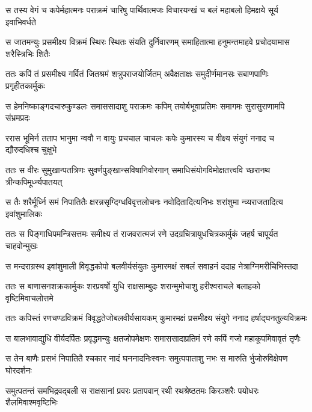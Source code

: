 \fourlineindentedshloka
{स तस्य वेगं च कपेर्महात्मनः}
{ पराक्रमं चारिषु पार्थिवात्मजः}
{विचारयन्खं च बलं महाबलो}
{ हिमक्षये सूर्य इवाभिवर्धते} %

\fourlineindentedshloka
{स जातमन्युः प्रसमीक्ष्य विक्रमं}
{ स्थिरः स्थितः संयति दुर्निवारणम्}
{समाहितात्मा हनुमन्तमाहवे}
{ प्रचोदयामास शरैस्त्रिभिः शितैः} %

\fourlineindentedshloka
{ततः कपिं तं प्रसमीक्ष्य गर्वितं}
{ जितश्रमं शत्रुपराजयोर्जितम्}
{अवैक्षताक्षः समुदीर्णमानसः}
{ सबाणपाणिः प्रगृहीतकार्मुकः} %

\fourlineindentedshloka
{स हेमनिष्काङ्गदचारुकुण्डलः}
{ समाससादाशु पराक्रमः कपिम्}
{तयोर्बभूवाप्रतिमः समागमः}
{ सुरासुराणामपि संभ्रमप्रदः} %

\fourlineindentedshloka
{ररास भूमिर्न तताप भानुमा}
{न्ववौ न वायुः प्रचचाल चाचलः}
{कपेः कुमारस्य च वीक्ष्य संयुगं}
{ ननाद च द्यौरुदधिश्च चुक्षुभे} %

\fourlineindentedshloka
{ततः स वीरः सुमुखान्पतत्रिणः}
{ सुवर्णपुङ्खान्सविषानिवोरगान्}
{समाधिसंयोगविमोक्षतत्त्ववि}
{च्छरानथ त्रीन्कपिमूर्ध्न्यपातयत्} %

\fourlineindentedshloka
{स तैः शरैर्मूर्ध्नि समं निपातितैः}
{ क्षरन्नसृग्दिग्धविवृत्तलोचनः}
{नवोदितादित्यनिभः शरांशुमा}
{न्व्यराजतादित्य इवांशुमालिकः} %

\fourlineindentedshloka
{ततः स पिङ्गाधिपमन्त्रिसत्तमः}
{ समीक्ष्य तं राजवरात्मजं रणे}
{उदग्रचित्रायुधचित्रकार्मुकं}
{ जहर्ष चापूर्यत चाहवोन्मुखः} %

\fourlineindentedshloka
{स मन्दराग्रस्थ इवांशुमाली}
{ विवृद्धकोपो बलवीर्यसंयुतः}
{कुमारमक्षं सबलं सवाहनं}
{ ददाह नेत्राग्निमरीचिभिस्तदा} %

\fourlineindentedshloka
{ततः स बाणासनशक्रकार्मुकः}
{ शरप्रवर्षो युधि राक्षसाम्बुदः}
{शरान्मुमोचाशु हरीश्वराचले}
{ बलाहको वृष्टिमिवाचलोत्तमे} %

\fourlineindentedshloka
{ततः कपिस्तं रणचण्डविक्रमं}
{ विवृद्धतेजोबलवीर्यसायकम्}
{कुमारमक्षं प्रसमीक्ष्य संयुगे}
{ ननाद हर्षाद्घनतुल्यविक्रमः} %

\fourlineindentedshloka
{स बालभावाद्युधि वीर्यदर्पितः}
{ प्रवृद्धमन्युः क्षतजोपमेक्षणः}
{समाससादाप्रतिमं रणे कपिं}
{ गजो महाकूपमिवावृतं तृणैः} %

\fourlineindentedshloka
{स तेन बाणैः प्रसभं निपातितै}
{श्चकार नादं घननादनिःस्वनः}
{समुत्पपाताशु नभः स मारुति}
{र्भुजोरुविक्षेपण घोरदर्शनः} %

\fourlineindentedshloka
{समुत्पतन्तं समभिद्रवद्बली}
{ स राक्षसानां प्रवरः प्रतापवान्}
{रथी रथश्रेष्ठतमः किरञ्शरैः}
{ पयोधरः शैलमिवाश्मवृष्टिभिः} %

